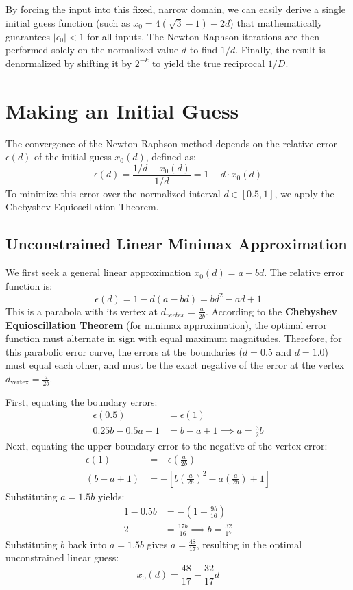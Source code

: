 \documentclass{article}
\begin{document}
By forcing the input into this fixed, narrow domain, we can easily derive a single initial guess function (such as $x_0 = 4(\sqrt{3}-1) - 2d$) that mathematically guarantees $|\epsilon_0| < 1$ for all inputs. The Newton-Raphson iterations are then performed solely on the normalized value $d$ to find $1/d$. Finally, the result is denormalized by shifting it by $2^{-k}$ to yield the true reciprocal $1/D$.

\section{Making an Initial Guess}

The convergence of the Newton-Raphson method depends on the relative error $\epsilon(d)$ of the initial guess $x_0(d)$, defined as:
\begin{equation}
    \epsilon(d) = \frac{1/d - x_0(d)}{1/d} = 1 - d \cdot x_0(d)
\end{equation}
To minimize this error over the normalized interval $d \in [0.5, 1]$, we apply the Chebyshev Equioscillation Theorem.

\subsection{Unconstrained Linear Minimax Approximation}
We first seek a general linear approximation $x_0(d) = a - bd$. The relative error function is:
\begin{equation}
    \epsilon(d) = 1 - d(a - bd) = bd^2 - ad + 1
\end{equation}
This is a parabola with its vertex at $d_{vertex} = \frac{a}{2b}$. According to the \textbf{Chebyshev Equioscillation Theorem} (for minimax approximation), the optimal error function must alternate in sign with equal maximum magnitudes. Therefore, for this parabolic error curve, the errors at the boundaries ($d=0.5$ and $d=1.0$) must equal each other, and must be the exact negative of the error at the vertex $d_{\text{vertex}} = \frac{a}{2b}$.

First, equating the boundary errors:
\begin{align*}
    \epsilon(0.5) &= \epsilon(1) \\
    0.25b - 0.5a + 1 &= b - a + 1 \implies a = \frac{3}{2}b
\end{align*}
Next, equating the upper boundary error to the negative of the vertex error:
\begin{align*}
    \epsilon(1) &= -\epsilon\left(\frac{a}{2b}\right) \\
    (b - a + 1) &= -\left[ b\left(\frac{a}{2b}\right)^2 - a\left(\frac{a}{2b}\right) + 1 \right]
\end{align*}
Substituting $a = 1.5b$ yields:
\begin{align*}
    1 - 0.5b &= -\left( 1 - \frac{9b}{16} \right) \\
    2 &= \frac{17b}{16} \implies b = \frac{32}{17}
\end{align*}
Substituting $b$ back into $a = 1.5b$ gives $a = \frac{48}{17}$, resulting in the optimal unconstrained linear guess:
\begin{equation}
    x_0(d) = \frac{48}{17} - \frac{32}{17}d
\end{equation}
\end{document}
